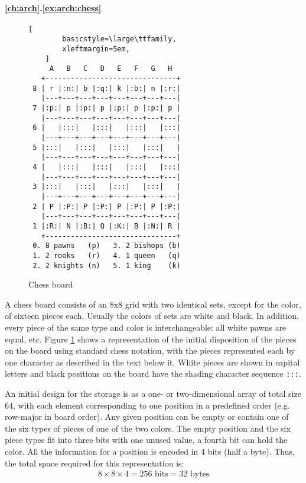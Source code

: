 \paragraph{\ref{ch:arch}.\ref{ex:arch:chess}}

\begin{figure}[ht]
    \centering
    \begin{lstlisting}[
        basicstyle=\large\ttfamily,
        xleftmargin=5em,
    ]
     A   B   C   D   E   F   G   H
   +-------------------------------+
 8 | r |:n:| b |:q:| k |:b:| n |:r:|
   |---+---+---+---+---+---+---+---|
 7 |:p:| p |:p:| p |:p:| p |:p:| p |
   |---+---+---+---+---+---+---+---|
 6 |   |:::|   |:::|   |:::|   |:::|
   |---+---+---+---+---+---+---+---|
 5 |:::|   |:::|   |:::|   |:::|   |
   |---+---+---+---+---+---+---+---|
 4 |   |:::|   |:::|   |:::|   |:::|
   |---+---+---+---+---+---+---+---|
 3 |:::|   |:::|   |:::|   |:::|   |
   |---+---+---+---+---+---+---+---|
 2 | P |:P:| P |:P:| P |:P:| P |:P:|
   |---+---+---+---+---+---+---+---|
 1 |:R:| N |:B:| Q |:K:| B |:N:| R |
   +-------------------------------+
 0. 8 pawns   (p)   3. 2 bishops (b)
 1. 2 rooks   (r)   4. 1 queen   (q)
 2. 2 knights (n)   5. 1 king    (k)
    \end{lstlisting}
    \caption{Chess board}
    \label{fig:sol:chess}
\end{figure}

A chess board consists of an 8x8 grid with two identical sets, except for the
color, of sixteen pieces each.  Usually the colors of sets are white and black.
In addition, every piece of the same type and color is interchangeable: all
white pawns are equal, etc.  Figure \ref{fig:sol:chess} shows a representation
of the initial disposition of the pieces on the board using standard chess
notation, with the pieces represented each by one character as described in the
text below it.  White pieces are shown in capital letters and black positions on
the board have the shading character sequence \texttt{:::}.

An initial design for the storage is as a one- or two-dimensional array of total
size 64, with each element corresponding to one position in a predefined order
(e.g. row-major in board order).  Any given position can be empty or contain one
of the six types of pieces of one of the two colors.  The empty position and the
six piece types fit into three bits with one unused value, a fourth bit can hold
the color.  All the information for a position is encoded in 4 bits (half a
byte).  Thus, the total space required for this representation is:
\begin{align*}
    8 \times 8 \times 4 = 256\text{ bits} = 32\text{ bytes}
\end{align*}

